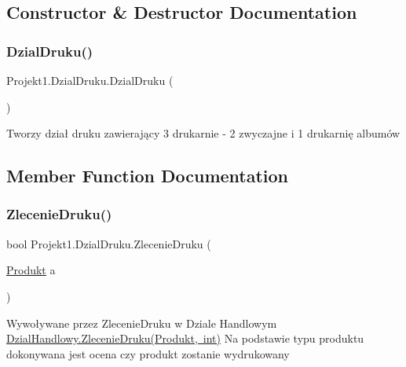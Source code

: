 \subsection{Constructor \& Destructor Documentation}
\mbox{\label{class_projekt1_1_1_dzial_druku_a8fe614a7a09f835bc697ce246ff0d20b}} 
\subsubsection{\texorpdfstring{DzialDruku()}{DzialDruku()}}
{\footnotesize\ttfamily Projekt1.\+Dzial\+Druku.\+Dzial\+Druku (\begin{DoxyParamCaption}{ }\end{DoxyParamCaption})}



Tworzy dział druku zawierający 3 drukarnie -\/ 2 zwyczajne i 1 drukarnię albumów 



\subsection{Member Function Documentation}
\mbox{\label{class_projekt1_1_1_dzial_druku_add9b31eeff5ca306c6dd033e83978323}} 
\subsubsection{\texorpdfstring{ZlecenieDruku()}{ZlecenieDruku()}}
{\footnotesize\ttfamily bool Projekt1.\+Dzial\+Druku.\+Zlecenie\+Druku (\begin{DoxyParamCaption}\item[{\mbox{\hyperlink{class_projekt1_1_1_produkt}{Produkt}}}]{a }\end{DoxyParamCaption})}



Wywoływane przez Zlecenie\+Druku w Dziale Handlowym \mbox{\hyperlink{class_projekt1_1_1_dzial_handlowy_a42c78f53cf41e75b39498a7da96e7bc3}{Dzial\+Handlowy.\+Zlecenie\+Druku(\+Produkt, int)}} Na podstawie typu produktu dokonywana jest ocena czy produkt zostanie wydrukowany 


